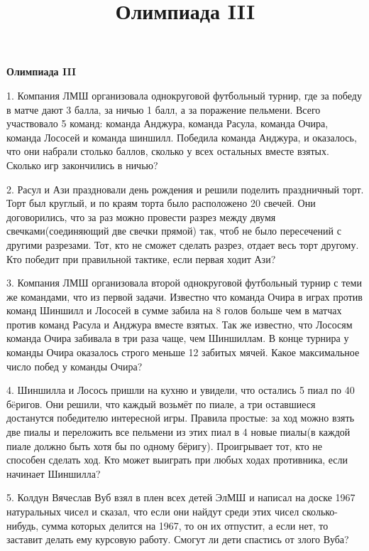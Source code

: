 \centerline{\bf \Huge Олимпиада III}
\title{Олимпиада III}

1. Компания ЛМШ организовала однокруговой футбольный турнир, где за победу в матче дают 3 балла, за ничью 1 балл, а за поражение пельмени. Всего участвовало 5 команд: команда Анджура, команда Расула, команда Очира, команда Лососей и команда шиншилл.
Победила команда Анджура, и оказалось, что они набрали столько баллов, сколько у всех остальных вместе взятых. Сколько игр закончились в ничью?

2. Расул и Ази праздновали день рождения и решили поделить праздничный торт. Торт был круглый, и по краям торта было расположено 20 свечей. Они договорились, что за раз можно провести разрез между двумя свечками(соединяющий две свечки прямой) так, чтоб не было пересечений с другими разрезами. Тот, кто не сможет сделать разрез, отдает весь торт другому. Кто победит при правильной тактике, если первая ходит Ази?

3. Компания ЛМШ организовала второй однокруговой футбольный турнир с теми же командами, что из первой задачи. Известно что команда Очира в играх против команд Шиншилл и Лососей в сумме забила на 8 голов больше чем в матчах против команд Расула и Анджура вместе взятых. Так же известно, что Лососям команда Очира забивала в три раза чаще, чем Шиншиллам. В конце турнира у команды Очира оказалось строго меньше 12 забитых мячей. Какое максимальное число побед у команды Очира? 

4. Шиншилла и Лосось пришли на кухню и увидели, что остались 5 пиал по 40 бëригов. Они решили, что каждый возьмёт по пиале, а три оставшиеся достанутся победителю интересной игры. Правила простые: за ход можно взять две пиалы и переложить все пельмени из этих пиал в 4 новые пиалы(в каждой пиале должно быть хотя бы по одному бёригу). Проигрывает тот, кто не способен сделать ход. Кто может выиграть при любых ходах противника, если начинает Шиншилла? 

5. Колдун Вячеслав Вуб взял в плен всех детей ЭлМШ и написал на доске 1967 натуральных чисел и сказал, что если они найдут среди этих чисел сколько-нибудь, сумма которых делится на 1967, то он их отпустит, а если нет, то заставит делать ему курсовую работу. Смогут ли дети спастись от злого Вуба?